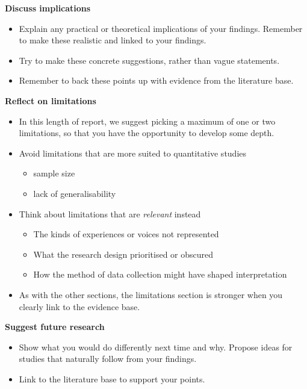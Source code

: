 \documentclass[
  english,
  letterpaper,
  DIV=11,
  numbers=noendperiod]{scrreprt}
\providecommand{\tightlist}{%
  \setlength{\itemsep}{0pt}\setlength{\parskip}{0pt}}
\begin{document}
\textbf{Discuss implications}

\begin{itemize}
\tightlist
\item
  Explain any practical or theoretical implications of your findings.
  Remember to make these realistic and linked to your findings.
\item
  Try to make these concrete suggestions, rather than vague statements.
\item
  Remember to back these points up with evidence from the literature
  base.
\end{itemize}

\textbf{Reflect on limitations}

\begin{itemize}
\tightlist
\item
  In this length of report, we suggest picking a maximum of one or two
  limitations, so that you have the opportunity to develop some depth.
\item
  Avoid limitations that are more suited to quantitative studies

  \begin{itemize}
  \tightlist
  \item
    sample size
  \item
    lack of generalisability
  \end{itemize}
\item
  Think about limitations that are \emph{relevant} instead

  \begin{itemize}
  \tightlist
  \item
    The kinds of experiences or voices not represented
  \item
    What the research design prioritised or obscured
  \item
    How the method of data collection might have shaped interpretation
  \end{itemize}
\item
  As with the other sections, the limitations section is stronger when
  you clearly link to the evidence base.
\end{itemize}

\textbf{Suggest future research}

\begin{itemize}
\tightlist
\item
  Show what you would do differently next time and why. Propose ideas
  for studies that naturally follow from your findings.
\item
  Link to the literature base to support your points.
\end{itemize}
\end{document}
